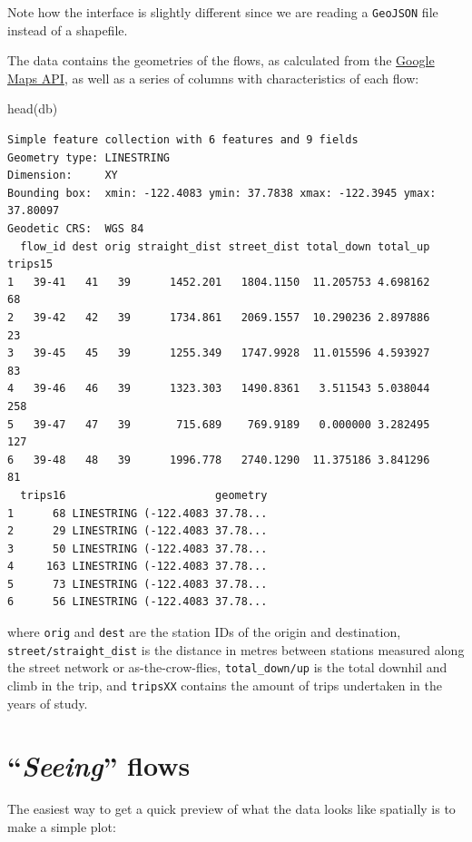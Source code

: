 \documentclass[
  letterpaper,
  DIV=11,
  numbers=noendperiod,
  oneside]{scrreprt}
\newenvironment{Shaded}{\begin{snugshade}}{\end{snugshade}}
\newcommand{\FunctionTok}[1]{\textcolor[rgb]{0.28,0.35,0.67}{#1}}
\newcommand{\NormalTok}[1]{\textcolor[rgb]{0.00,0.23,0.31}{#1}}
\begin{document}
Note how the interface is slightly different since we are reading a
\texttt{GeoJSON} file instead of a shapefile.

The data contains the geometries of the flows, as calculated from the
\href{https://developers.google.com/maps/}{Google Maps API}, as well as
a series of columns with characteristics of each flow:

\begin{Shaded}
\begin{Highlighting}[]
\FunctionTok{head}\NormalTok{(db)}
\end{Highlighting}
\end{Shaded}

\begin{verbatim}
Simple feature collection with 6 features and 9 fields
Geometry type: LINESTRING
Dimension:     XY
Bounding box:  xmin: -122.4083 ymin: 37.7838 xmax: -122.3945 ymax: 37.80097
Geodetic CRS:  WGS 84
  flow_id dest orig straight_dist street_dist total_down total_up trips15
1   39-41   41   39      1452.201   1804.1150  11.205753 4.698162      68
2   39-42   42   39      1734.861   2069.1557  10.290236 2.897886      23
3   39-45   45   39      1255.349   1747.9928  11.015596 4.593927      83
4   39-46   46   39      1323.303   1490.8361   3.511543 5.038044     258
5   39-47   47   39       715.689    769.9189   0.000000 3.282495     127
6   39-48   48   39      1996.778   2740.1290  11.375186 3.841296      81
  trips16                       geometry
1      68 LINESTRING (-122.4083 37.78...
2      29 LINESTRING (-122.4083 37.78...
3      50 LINESTRING (-122.4083 37.78...
4     163 LINESTRING (-122.4083 37.78...
5      73 LINESTRING (-122.4083 37.78...
6      56 LINESTRING (-122.4083 37.78...
\end{verbatim}

where \texttt{orig} and \texttt{dest} are the station IDs of the origin
and destination, \texttt{street/straight\_dist} is the distance in
metres between stations measured along the street network or
as-the-crow-flies, \texttt{total\_down/up} is the total downhil and
climb in the trip, and \texttt{tripsXX} contains the amount of trips
undertaken in the years of study.

\section{\texorpdfstring{``\emph{Seeing}''
flows}{``Seeing'' flows}}\label{seeing-flows}

The easiest way to get a quick preview of what the data looks like
spatially is to make a simple plot:
\end{document}
